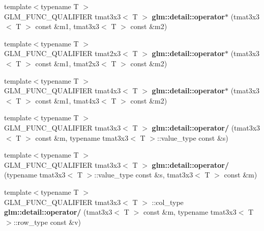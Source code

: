 \begin{DoxyCompactItemize}
\item 
\hypertarget{namespaceglm_1_1detail_a760b11487e92287a195d540c867c286a}{{\footnotesize template$<$typename T $>$ }\\\-G\-L\-M\-\_\-\-F\-U\-N\-C\-\_\-\-Q\-U\-A\-L\-I\-F\-I\-E\-R tmat3x3$<$ \-T $>$ {\bfseries glm\-::detail\-::operator$\ast$} (tmat3x3$<$ \-T $>$ const \&m1, tmat3x3$<$ \-T $>$ const \&m2)}\label{namespaceglm_1_1detail_a760b11487e92287a195d540c867c286a}

\item 
\hypertarget{namespaceglm_1_1detail_a30b3fdb9ba1e8a29bd5fe3d0e3ecfd38}{{\footnotesize template$<$typename T $>$ }\\\-G\-L\-M\-\_\-\-F\-U\-N\-C\-\_\-\-Q\-U\-A\-L\-I\-F\-I\-E\-R tmat2x3$<$ \-T $>$ {\bfseries glm\-::detail\-::operator$\ast$} (tmat3x3$<$ \-T $>$ const \&m1, tmat2x3$<$ \-T $>$ const \&m2)}\label{namespaceglm_1_1detail_a30b3fdb9ba1e8a29bd5fe3d0e3ecfd38}

\item 
\hypertarget{namespaceglm_1_1detail_a041563813c0c18989cfc4fd64f69cff1}{{\footnotesize template$<$typename T $>$ }\\\-G\-L\-M\-\_\-\-F\-U\-N\-C\-\_\-\-Q\-U\-A\-L\-I\-F\-I\-E\-R tmat4x3$<$ \-T $>$ {\bfseries glm\-::detail\-::operator$\ast$} (tmat3x3$<$ \-T $>$ const \&m1, tmat4x3$<$ \-T $>$ const \&m2)}\label{namespaceglm_1_1detail_a041563813c0c18989cfc4fd64f69cff1}

\item 
\hypertarget{namespaceglm_1_1detail_ab4c968d521892c340f090b598160d005}{{\footnotesize template$<$typename T $>$ }\\\-G\-L\-M\-\_\-\-F\-U\-N\-C\-\_\-\-Q\-U\-A\-L\-I\-F\-I\-E\-R tmat3x3$<$ \-T $>$ {\bfseries glm\-::detail\-::operator/} (tmat3x3$<$ \-T $>$ const \&m, typename tmat3x3$<$ \-T $>$\-::value\-\_\-type const \&s)}\label{namespaceglm_1_1detail_ab4c968d521892c340f090b598160d005}

\item 
\hypertarget{namespaceglm_1_1detail_a9f064c716ea2ae07f2c95d0b25809ad7}{{\footnotesize template$<$typename T $>$ }\\\-G\-L\-M\-\_\-\-F\-U\-N\-C\-\_\-\-Q\-U\-A\-L\-I\-F\-I\-E\-R tmat3x3$<$ \-T $>$ {\bfseries glm\-::detail\-::operator/} (typename tmat3x3$<$ \-T $>$\-::value\-\_\-type const \&s, tmat3x3$<$ \-T $>$ const \&m)}\label{namespaceglm_1_1detail_a9f064c716ea2ae07f2c95d0b25809ad7}

\item 
\hypertarget{namespaceglm_1_1detail_ac5bacf2063ce5a377650afe09360cec0}{{\footnotesize template$<$typename T $>$ }\\\-G\-L\-M\-\_\-\-F\-U\-N\-C\-\_\-\-Q\-U\-A\-L\-I\-F\-I\-E\-R tmat3x3$<$ \-T $>$\*
\-::col\-\_\-type {\bfseries glm\-::detail\-::operator/} (tmat3x3$<$ \-T $>$ const \&m, typename tmat3x3$<$ \-T $>$\-::row\-\_\-type const \&v)}\label{namespaceglm_1_1detail_ac5bacf2063ce5a377650afe09360cec0}


\end{DoxyCompactItemize}
